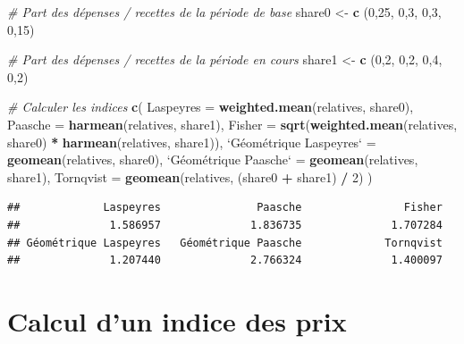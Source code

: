 \documentclass[]{article}
\newenvironment{Shaded}{\begin{snugshade}}{\end{snugshade}}
\newcommand{\CommentTok}[1]{\textcolor[rgb]{0.56,0.35,0.01}{\textit{#1}}}
\newcommand{\DataTypeTok}[1]{\textcolor[rgb]{0.13,0.29,0.53}{#1}}
\newcommand{\DecValTok}[1]{\textcolor[rgb]{0.00,0.00,0.81}{#1}}
\newcommand{\KeywordTok}[1]{\textcolor[rgb]{0.13,0.29,0.53}{\textbf{#1}}}
\newcommand{\NormalTok}[1]{#1}
\newcommand{\OperatorTok}[1]{\textcolor[rgb]{0.81,0.36,0.00}{\textbf{#1}}}
\newcommand{\StringTok}[1]{\textcolor[rgb]{0.31,0.60,0.02}{#1}}
\begin{document}
\begin{Shaded}
\begin{Highlighting}[]
\CommentTok{# Part des dépenses / recettes de la période de base}
\NormalTok{share0 <-}\StringTok{ }\KeywordTok{c}\NormalTok{ (}\DecValTok{0}\NormalTok{,}\DecValTok{25}\NormalTok{, }\DecValTok{0}\NormalTok{,}\DecValTok{3}\NormalTok{, }\DecValTok{0}\NormalTok{,}\DecValTok{3}\NormalTok{, }\DecValTok{0}\NormalTok{,}\DecValTok{15}\NormalTok{)}

\CommentTok{# Part des dépenses / recettes de la période en cours}
\NormalTok{share1 <-}\StringTok{ }\KeywordTok{c}\NormalTok{ (}\DecValTok{0}\NormalTok{,}\DecValTok{2}\NormalTok{, }\DecValTok{0}\NormalTok{,}\DecValTok{2}\NormalTok{, }\DecValTok{0}\NormalTok{,}\DecValTok{4}\NormalTok{, }\DecValTok{0}\NormalTok{,}\DecValTok{2}\NormalTok{)}

\CommentTok{# Calculer les indices}
\KeywordTok{c}\NormalTok{(}
  \DataTypeTok{Laspeyres =} \KeywordTok{weighted.mean}\NormalTok{(relatives, share0),}
  \DataTypeTok{Paasche =} \KeywordTok{harmean}\NormalTok{(relatives, share1),}
  \DataTypeTok{Fisher =} \KeywordTok{sqrt}\NormalTok{(}\KeywordTok{weighted.mean}\NormalTok{(relatives, share0) }\OperatorTok{*}\StringTok{ }\KeywordTok{harmean}\NormalTok{(relatives, share1)),}
  \StringTok{`}\DataTypeTok{Géométrique Laspeyres}\StringTok{`}\NormalTok{ =}\StringTok{ }\KeywordTok{geomean}\NormalTok{(relatives, share0),}
  \StringTok{`}\DataTypeTok{Géométrique Paasche}\StringTok{`}\NormalTok{ =}\StringTok{ }\KeywordTok{geomean}\NormalTok{(relatives, share1),}
  \DataTypeTok{Tornqvist =} \KeywordTok{geomean}\NormalTok{(relatives, (share0 }\OperatorTok{+}\StringTok{ }\NormalTok{share1) }\OperatorTok{/}\StringTok{ }\DecValTok{2}\NormalTok{)}
\NormalTok{)}
\end{Highlighting}
\end{Shaded}

\begin{verbatim}
##             Laspeyres               Paasche                Fisher 
##              1.586957              1.836735              1.707284 
## Géométrique Laspeyres   Géométrique Paasche             Tornqvist 
##              1.207440              2.766324              1.400097
\end{verbatim}

\hypertarget{calcul-dun-indice-des-prix}{%
\section{Calcul d'un indice des prix}\label{calcul-dun-indice-des-prix}}
\end{document}

